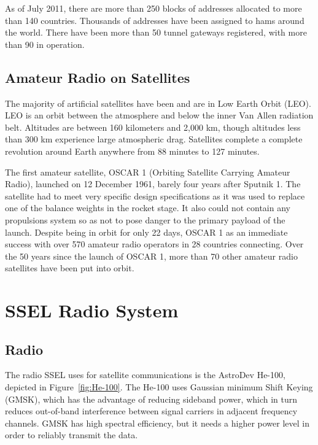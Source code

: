 \documentclass[letter,12pt]{article}
\begin{document}
		As of July 2011, there are more than 250 blocks of addresses allocated to more than 140 countries. Thousands of addresses have been assigned to hams around the world.  There have been more than 50 tunnel gateways registered, with more than 90 in operation. \cite{Kantor_11}
		
	\subsection{Amateur Radio on Satellites}
		The majority of artificial satellites have been and are in Low Earth Orbit (LEO). LEO is an orbit between the atmosphere and below the inner Van Allen radiation belt.  Altitudes are between 160 kilometers and 2,000 km, though altitudes less than 300 km experience large atmospheric drag.  Satellites complete a complete revolution around Earth anywhere from 88 minutes to 127 minutes.
		
		The first amateur satellite, OSCAR 1 (Orbiting Satellite Carrying Amateur Radio), launched on 12 December 1961, barely four years after Sputnik 1. The satellite had to meet very specific design specifications as it was used to replace one of the balance weights in the rocket stage. It also could not contain any propulsions system so as not to pose danger to the primary payload of the launch.  Despite being in orbit for only 22 days, OSCAR 1 as an immediate success with over 570 amateur radio operators in 28 countries connecting. Over the 50 years since the launch of OSCAR 1, more than 70 other amateur radio satellites have been put into orbit. \cite{RadioSatellites_06}
		
		
	
\section{SSEL Radio System}
	\subsection{Radio}
		The radio SSEL uses for satellite communications is the AstroDev He-100, depicted in Figure~\ref{fig:He-100}. The He-100 uses Gaussian minimum Shift Keying (GMSK), which has the advantage of reducing sideband power, which in turn reduces out-of-band interference between signal carriers in adjacent frequency channels. GMSK has high spectral efficiency, but it needs a higher power level in order to reliably transmit the data. \cite{Wiki_MSK}
		
\end{document}

